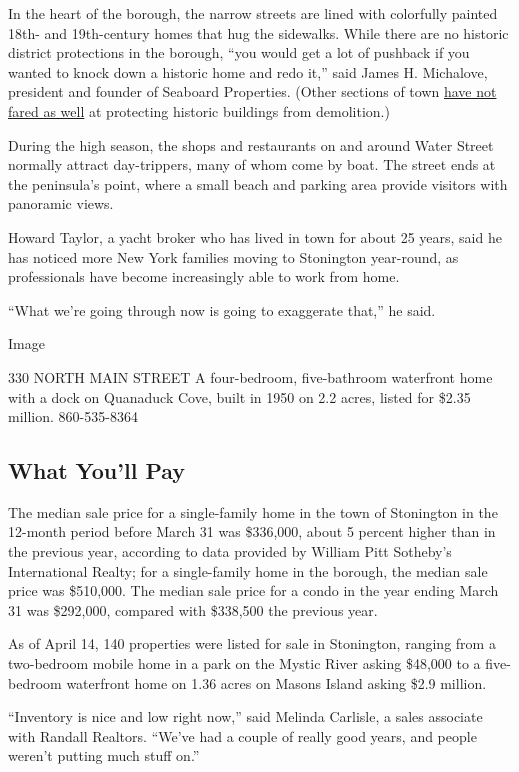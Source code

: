In the heart of the borough, the narrow streets are lined with
colorfully painted 18th- and 19th-century homes that hug the sidewalks.
While there are no historic district protections in the borough, ``you
would get a lot of pushback if you wanted to knock down a historic home
and redo it,'' said James H. Michalove, president and founder of
Seaboard Properties. (Other sections of town
\href{https://www.theday.com/article/20190321/NWS05/190329861}{have not
fared as well} at protecting historic buildings from demolition.)

During the high season, the shops and restaurants on and around Water
Street normally attract day-trippers, many of whom come by boat. The
street ends at the peninsula's point, where a small beach and parking
area provide visitors with panoramic views.

Howard Taylor, a yacht broker who has lived in town for about 25 years,
said he has noticed more New York families moving to Stonington
year-round, as professionals have become increasingly able to work from
home.

``What we're going through now is going to exaggerate that,'' he said.

Image

330 NORTH MAIN STREET \textbar{} A four-bedroom, five-bathroom
waterfront home with a dock on Quanaduck Cove, built in 1950 on 2.2
acres, listed for \$2.35 million. 860-535-8364

\hypertarget{what-youll-pay}{%
\subsection{What You'll Pay}\label{what-youll-pay}}

The median sale price for a single-family home in the town of Stonington
in the 12-month period before March 31 was \$336,000, about 5 percent
higher than in the previous year, according to data provided by William
Pitt Sotheby's International Realty; for a single-family home in the
borough, the median sale price was \$510,000. The median sale price for
a condo in the year ending March 31 was \$292,000, compared with
\$338,500 the previous year.

As of April 14, 140 properties were listed for sale in Stonington,
ranging from a two-bedroom mobile home in a park on the Mystic River
asking \$48,000 to a five-bedroom waterfront home on 1.36 acres on
Masons Island asking \$2.9 million.

``Inventory is nice and low right now,'' said Melinda Carlisle, a sales
associate with Randall Realtors. ``We've had a couple of really good
years, and people weren't putting much stuff on.''

